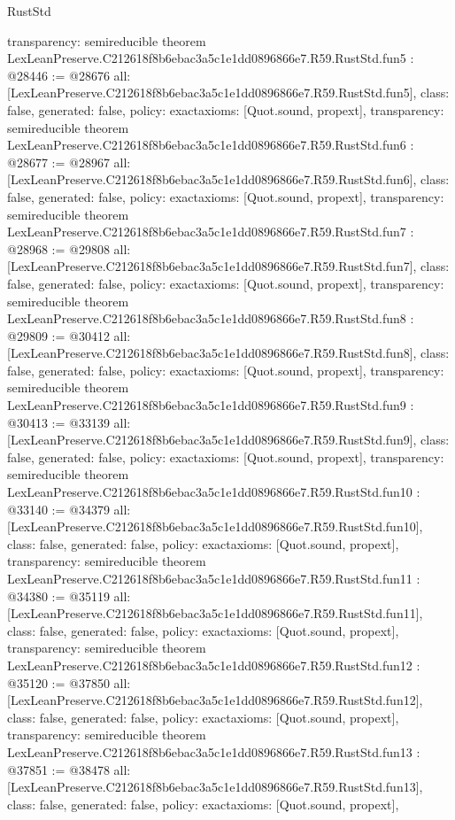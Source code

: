 \begin{lexlean}{RustStd}
\begin{coremodule}
{  transparency: semireducible
}
theorem LexLeanPreserve.C212618f8b6ebac3a5c1e1dd0896866e7.R59.RustStd.fun5 : @28446 := @28676 {
  all: [LexLeanPreserve.C212618f8b6ebac3a5c1e1dd0896866e7.R59.RustStd.fun5],
  class: false,
  generated: false,
  policy: exact{axioms: [Quot.sound, propext]},
  transparency: semireducible
}
theorem LexLeanPreserve.C212618f8b6ebac3a5c1e1dd0896866e7.R59.RustStd.fun6 : @28677 := @28967 {
  all: [LexLeanPreserve.C212618f8b6ebac3a5c1e1dd0896866e7.R59.RustStd.fun6],
  class: false,
  generated: false,
  policy: exact{axioms: [Quot.sound, propext]},
  transparency: semireducible
}
theorem LexLeanPreserve.C212618f8b6ebac3a5c1e1dd0896866e7.R59.RustStd.fun7 : @28968 := @29808 {
  all: [LexLeanPreserve.C212618f8b6ebac3a5c1e1dd0896866e7.R59.RustStd.fun7],
  class: false,
  generated: false,
  policy: exact{axioms: [Quot.sound, propext]},
  transparency: semireducible
}
theorem LexLeanPreserve.C212618f8b6ebac3a5c1e1dd0896866e7.R59.RustStd.fun8 : @29809 := @30412 {
  all: [LexLeanPreserve.C212618f8b6ebac3a5c1e1dd0896866e7.R59.RustStd.fun8],
  class: false,
  generated: false,
  policy: exact{axioms: [Quot.sound, propext]},
  transparency: semireducible
}
theorem LexLeanPreserve.C212618f8b6ebac3a5c1e1dd0896866e7.R59.RustStd.fun9 : @30413 := @33139 {
  all: [LexLeanPreserve.C212618f8b6ebac3a5c1e1dd0896866e7.R59.RustStd.fun9],
  class: false,
  generated: false,
  policy: exact{axioms: [Quot.sound, propext]},
  transparency: semireducible
}
theorem LexLeanPreserve.C212618f8b6ebac3a5c1e1dd0896866e7.R59.RustStd.fun10 : @33140 := @34379 {
  all: [LexLeanPreserve.C212618f8b6ebac3a5c1e1dd0896866e7.R59.RustStd.fun10],
  class: false,
  generated: false,
  policy: exact{axioms: [Quot.sound, propext]},
  transparency: semireducible
}
theorem LexLeanPreserve.C212618f8b6ebac3a5c1e1dd0896866e7.R59.RustStd.fun11 : @34380 := @35119 {
  all: [LexLeanPreserve.C212618f8b6ebac3a5c1e1dd0896866e7.R59.RustStd.fun11],
  class: false,
  generated: false,
  policy: exact{axioms: [Quot.sound, propext]},
  transparency: semireducible
}
theorem LexLeanPreserve.C212618f8b6ebac3a5c1e1dd0896866e7.R59.RustStd.fun12 : @35120 := @37850 {
  all: [LexLeanPreserve.C212618f8b6ebac3a5c1e1dd0896866e7.R59.RustStd.fun12],
  class: false,
  generated: false,
  policy: exact{axioms: [Quot.sound, propext]},
  transparency: semireducible
}
theorem LexLeanPreserve.C212618f8b6ebac3a5c1e1dd0896866e7.R59.RustStd.fun13 : @37851 := @38478 {
  all: [LexLeanPreserve.C212618f8b6ebac3a5c1e1dd0896866e7.R59.RustStd.fun13],
  class: false,
  generated: false,
  policy: exact{axioms: [Quot.sound, propext]},
}
\end{coremodule}
\end{lexlean}
